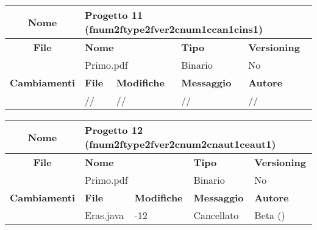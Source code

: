 
\begin{table}[ht]
\footnotesize
\begin{tabular}{|c|p{2.5cm}|p{2cm}|p{2.5cm}|p{2.5cm}|}
  \hline
  \textbf{Nome}	& \multicolumn{4}{l|}{Progetto 11 (fnum2ftype2fver2cnum1ccan1cins1)} 									\\
  \hline
  \rowcolor{lightgray}\textbf{File} 		& \multicolumn{2}{l|}{\textbf{Nome}}		& \textbf{Tipo}		& \textbf{Versioning} 		\\
						\cline{2-5}
						& \multicolumn{2}{l|}{Primo.pdf}		& Binario		& No				\\
  \hline
  \rowcolor{lightgray}\textbf{Cambiamenti}	& \textbf{File}		&\textbf{Modifiche}	& \textbf{Messaggio}	& \textbf{Autore}		\\
						\cline{2-5}
						& //			& //	  		& //			& //				\\
						
  \hline
\end{tabular}
\end{table}

\begin{table}[ht]
\footnotesize
\begin{tabular}{|c|p{2.5cm}|p{2cm}|p{2.5cm}|p{2.5cm}|}
  \hline
  \textbf{Nome}	& \multicolumn{4}{l|}{Progetto 12 (fnum2ftype2fver2cnum2cnaut1ceaut1)} 									\\
  \hline
  \rowcolor{lightgray}\textbf{File} 		& \multicolumn{2}{l|}{\textbf{Nome}}		& \textbf{Tipo}		& \textbf{Versioning} 		\\
						\cline{2-5}
						& \multicolumn{2}{l|}{Primo.pdf}		& Binario		& No				\\
  \hline
  \rowcolor{lightgray}\textbf{Cambiamenti}	& \textbf{File}		&\textbf{Modifiche}	& \textbf{Messaggio}	& \textbf{Autore}		\\
						\cline{2-5}
						& Eras.java		& -12	 		& Cancellato		& Beta ()			\\
						
  \hline
\end{tabular}
\end{table}

